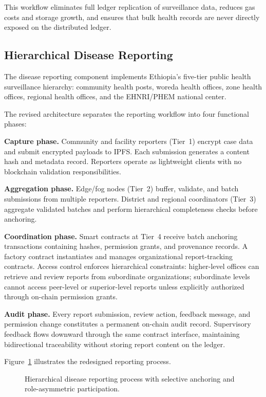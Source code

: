 This workflow eliminates full ledger replication of surveillance data, reduces gas costs and storage growth, and ensures that bulk health records are never directly exposed on the distributed ledger.

\subsection{Hierarchical Disease Reporting}\label{subsec:reporting}

The disease reporting component implements Ethiopia's five-tier public health surveillance hierarchy: community health posts, woreda health offices, zone health offices, regional health offices, and the EHNRI/PHEM national center.

The revised architecture separates the reporting workflow into four functional phases:

\textbf{Capture phase.} Community and facility reporters (Tier~1) encrypt case data and submit encrypted payloads to IPFS. Each submission generates a content hash and metadata record. Reporters operate as lightweight clients with no blockchain validation responsibilities.

\textbf{Aggregation phase.} Edge/fog nodes (Tier~2) buffer, validate, and batch submissions from multiple reporters. District and regional coordinators (Tier~3) aggregate validated batches and perform hierarchical completeness checks before anchoring.

\textbf{Coordination phase.} Smart contracts at Tier~4 receive batch anchoring transactions containing hashes, permission grants, and provenance records. A factory contract instantiates and manages organizational report-tracking contracts. Access control enforces hierarchical constraints: higher-level offices can retrieve and review reports from subordinate organizations; subordinate levels cannot access peer-level or superior-level reports unless explicitly authorized through on-chain permission grants.

\textbf{Audit phase.} Every report submission, review action, feedback message, and permission change constitutes a permanent on-chain audit record. Supervisory feedback flows downward through the same contract interface, maintaining bidirectional traceability without storing report content on the ledger.

Figure~\ref{fig:reporting} illustrates the redesigned reporting process.

\begin{figure}[!ht]
\centering
{}
\caption{Hierarchical disease reporting process with selective anchoring and role-asymmetric participation.}\label{fig:reporting}
\end{figure}


